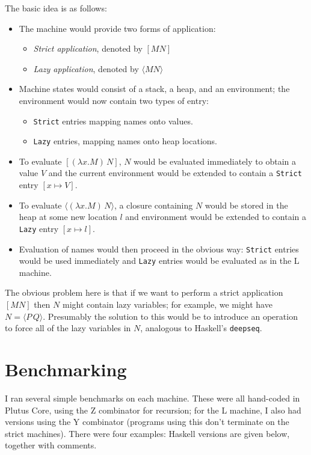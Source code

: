 \documentclass[a4paper]{article}
\begin{document}
\noindent The basic idea is as follows:
\begin{itemize}
\item The machine would provide two forms of application:
  \begin{itemize}
  \item \textit{Strict application}, denoted by $[M N]$
  \item \textit{Lazy application}, denoted by $\langle M N \rangle$
  \end{itemize}
  \item Machine states would consist of a stack, a heap, and an environment;
    the environment would now contain two types of entry:
  \begin{itemize}
  \item \texttt{Strict} entries mapping names onto values.
  \item \texttt{Lazy} entries, mapping names onto heap locations.
  \end{itemize}
  \item To evaluate $[(\lambda x.M)\, N]$, $N$ would be evaluated immediately
    to obtain a value $V$ and the current environment would be extended to
    contain a \texttt{Strict} entry $[x \mapsto V]$.
  \item To evaluate $\langle (\lambda x.M)\, N \rangle$, a closure
    containing $N$ would be stored in the heap at some new location
    $l$ and environment would be extended to contain a \texttt{Lazy}
    entry $[x \mapsto l]$.
  \item Evaluation of names would then proceed in the obvious way:
    \texttt{Strict} entries would be used immediately and \texttt{Lazy}
    entries would be evaluated as in the L machine.
\end{itemize}


\noindent The obvious problem here is that if we want to perform a
strict application $[M N]$ then $N$ might contain lazy variables; for
example, we might have $N = \langle P\, Q \rangle$.  Presumably the solution to
this would be to introduce an operation to force all of the lazy
variables in $N$, analogous to Haskell's \texttt{deepseq}.



\section{Benchmarking}\label{sec:benchmarks}
I ran several simple benchmarks on each machine. These were all hand-coded
in Plutus Core, using the Z combinator for recursion; for the L machine, I also
had versions using the Y combinator (programs using this don't terminate on the 
strict machines).  There were four examples: Haskell versions are given below, 
together with comments.
\end{document}
